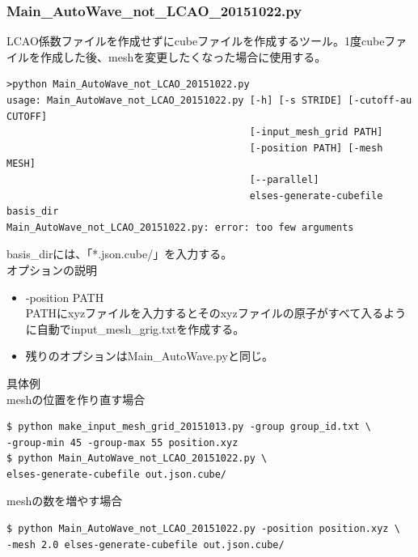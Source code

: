 \documentclass{jsarticle}
\begin{document}
\subsubsection{Main\_AutoWave\_not\_LCAO\_20151022.py}
LCAO係数ファイルを作成せずにcubeファイルを作成するツール。1度cubeファイルを作成した後、meshを変更したくなった場合に使用する。\\
\begin{Verbatim}[frame=single]
>python Main_AutoWave_not_LCAO_20151022.py
usage: Main_AutoWave_not_LCAO_20151022.py [-h] [-s STRIDE] [-cutoff-au CUTOFF]
                                          [-input_mesh_grid PATH]
                                          [-position PATH] [-mesh MESH]
                                          [--parallel]
                                          elses-generate-cubefile basis_dir
Main_AutoWave_not_LCAO_20151022.py: error: too few arguments
\end{Verbatim}
basis\_dirには、「*.json.cube/」を入力する。\\

オプションの説明
\begin{itemize}
\item -position PATH\\
PATHにxyzファイルを入力するとそのxyzファイルの原子がすべて入るように自動でinput\_mesh\_grig.txtを作成する。\\
\item 残りのオプションはMain\_AutoWave.pyと同じ。
\end{itemize}

具体例\\
meshの位置を作り直す場合
\begin{Verbatim}[frame=single]
$ python make_input_mesh_grid_20151013.py -group group_id.txt \
-group-min 45 -group-max 55 position.xyz
$ python Main_AutoWave_not_LCAO_20151022.py \
elses-generate-cubefile out.json.cube/
\end{Verbatim}

meshの数を増やす場合
\begin{Verbatim}[frame=single]
$ python Main_AutoWave_not_LCAO_20151022.py -position position.xyz \
-mesh 2.0 elses-generate-cubefile out.json.cube/
\end{Verbatim}

\end{document}
